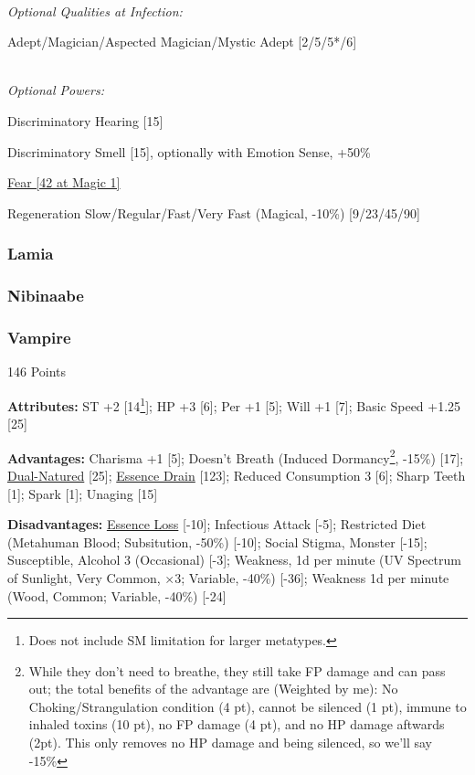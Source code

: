 \begin{multicols*}{3}
	\textit{\\Optional Qualities at Infection:}
	
	Adept/Magician/Aspected Magician/Mystic Adept [2/5/5*/6]
	
	\textit{\\Optional Powers:}
	
	
	Discriminatory Hearing [15]
	
	Discriminatory Smell [15], optionally with Emotion Sense, +50\%
	
	\hyperref[fear]{Fear [42 at Magic 1]}
	
	Regeneration Slow/Regular/Fast/Very Fast (Magical, -10\%) [9/23/45/90]
		
	\subsubsection{Lamia}\label{lamia}
	
	\subsubsection{Nibinaabe}\label{nibinaabe}
	
	\subsubsection{Vampire}\label{vampire}
	\begin{flushright}
		146 Points
	\end{flushright}
	
	\textbf{Attributes:}
	ST +2 [14\footnote{Does not include SM limitation for larger metatypes.}]; HP +3 [6]; Per +1 [5]; Will +1 [7]; Basic Speed +1.25 [25]
	
	\textbf{Advantages:}
	Charisma +1 [5]; Doesn't Breath (Induced Dormancy\footnote{While they don't need to breathe, they still take FP damage and can pass out; the total benefits of the advantage are (Weighted by me): No Choking/Strangulation condition (4 pt), cannot be silenced (1 pt), immune to inhaled toxins (10 pt), no FP damage (4 pt), and no HP damage aftwards (2pt). This only removes no HP damage and being silenced, so we'll say -15\%}, -15\%) [17]; \hyperref[dual_natured]{Dual-Natured} [25];  \hyperref[essence_drain]{Essence Drain} [123]; Reduced Consumption 3 [6]; Sharp Teeth [1]; Spark [1]; Unaging [15]
		
	\textbf{Disadvantages:}	
	\hyperref[essence_loss]{Essence Loss} [-10]; Infectious Attack [-5]; Restricted Diet (Metahuman Blood; Subsitution, -50\%) [-10]; Social Stigma, Monster [-15]; Susceptible, Alcohol 3 (Occasional) [-3]; Weakness, 1d per minute (UV Spectrum of Sunlight, Very Common, $\times$3; Variable, -40\%) [-36]; Weakness 1d per minute (Wood, Common; Variable, -40\%) [-24]
	

\end{multicols*}
